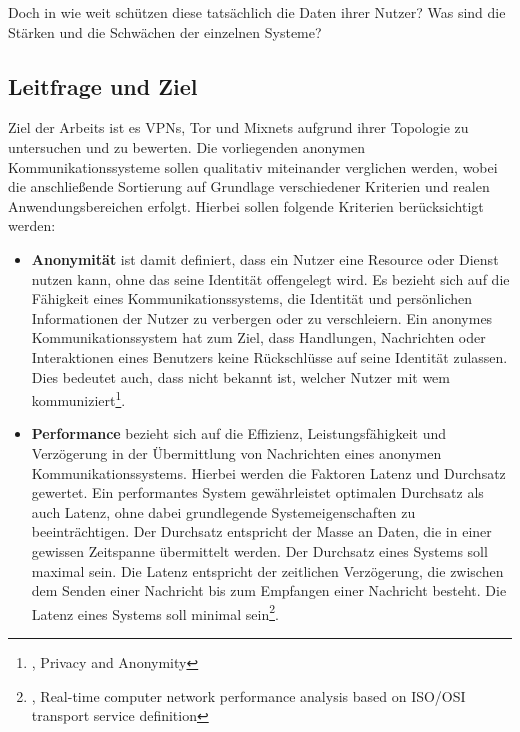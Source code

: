 Doch in wie weit schützen diese tatsächlich die Daten ihrer Nutzer? Was sind die Stärken und die Schwächen der einzelnen Systeme? 

\subsection{Leitfrage und Ziel}

Ziel der Arbeits ist es VPNs, Tor und Mixnets aufgrund ihrer Topologie zu untersuchen und zu bewerten. Die vorliegenden anonymen Kommunikationssysteme sollen qualitativ miteinander verglichen werden, wobei die anschließende Sortierung auf Grundlage verschiedener Kriterien und realen Anwendungsbereichen erfolgt. Hierbei sollen folgende Kriterien berücksichtigt werden:

\begin{itemize}
    \item \textbf{Anonymität} ist damit definiert, dass ein Nutzer eine Resource oder Dienst nutzen kann, ohne das seine Identität offengelegt wird. Es bezieht sich auf die Fähigkeit eines Kommunikationssystems, die Identität und persönlichen Informationen der Nutzer zu verbergen oder zu verschleiern. Ein anonymes Kommunikationssystem hat zum Ziel, dass Handlungen, Nachrichten oder Interaktionen eines Benutzers keine Rückschlüsse auf seine Identität zulassen. Dies bedeutet auch, dass nicht bekannt ist, welcher Nutzer mit wem kommuniziert\footnote{\cite{DefinitionOfAnonymity}, Privacy and Anonymity}.

    \item \textbf{Performance} bezieht sich auf die Effizienz, Leistungsfähigkeit und Verzögerung in der Übermittlung von Nachrichten eines anonymen Kommunikationssystems. Hierbei werden die Faktoren Latenz und Durchsatz gewertet. Ein performantes System gewährleistet optimalen Durchsatz als auch Latenz, ohne dabei grundlegende Systemeigenschaften zu beeinträchtigen. Der Durchsatz entspricht der Masse an Daten, die in einer gewissen Zeitspanne übermittelt werden. Der Durchsatz eines Systems soll maximal sein. Die Latenz entspricht der zeitlichen Verzögerung, die zwischen dem Senden einer Nachricht bis zum Empfangen einer Nachricht besteht. Die Latenz eines Systems soll minimal sein\footnote{\cite{ComputerNetworkPerformanceAnalysis}, Real-time computer network performance analysis based on ISO/OSI transport service definition}.
\end{itemize}
